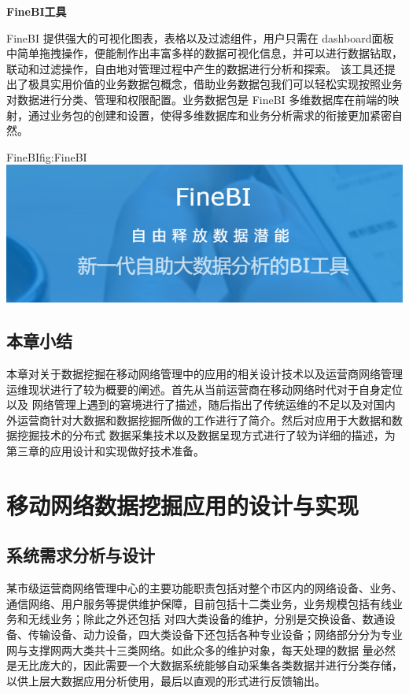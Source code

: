 \documentclass{HustGraduPaper}
\begin{document}
    {\songti \bfseries FineBI工具\\}

    FineBI 提供强大的可视化图表，表格以及过滤组件，用户只需在 dashboard面板中简单拖拽操作，便能制作出丰富多样的数据可视化信息，并可以进行数据钻取，联动和过滤操作，自由地对管理过程中产生的数据进行分析和探索。
    该工具还提出了极具实用价值的业务数据包概念，借助业务数据包我们可以轻松实现按照业务对数据进行分类、管理和权限配置。业务数据包是 FineBI 多维数据库在前端的映射，通过业务包的创建和设置，使得多维数据库和业务分析需求的衔接更加紧密自然。
    \begin{generalfig}[htb]{FineBI}{fig:FineBI} 
        \includegraphics[scale = 0.4]{Figures/FineBI.png}
    \end{generalfig}

    \subsection{本章小结}
    本章对关于数据挖掘在移动网络管理中的应用的相关设计技术以及运营商网络管理运维现状进行了较为概要的阐述。首先从当前运营商在移动网络时代对于自身定位以及
    网络管理上遇到的窘境进行了描述，随后指出了传统运维的不足以及对国内外运营商针对大数据和数据挖掘所做的工作进行了简介。然后对应用于大数据和数据挖掘技术的分布式
    数据采集技术以及数据呈现方式进行了较为详细的描述，为第三章的应用设计和实现做好技术准备。
    \clearpage

    \section{移动网络数据挖掘应用的设计与实现}
    \subsection{系统需求分析与设计}
    某市级运营商网络管理中心的主要功能职责包括对整个市区内的网络设备、业务、通信网络、用户服务等提供维护保障，目前包括十二类业务，业务规模包括有线业务和无线业务；除此之外还包括
    对四大类设备的维护，分别是交换设备、数通设备、传输设备、动力设备，四大类设备下还包括各种专业设备；网络部分分为专业网与支撑网两大类共十三类网络。如此众多的维护对象，每天处理的数据
    量必然是无比庞大的，因此需要一个大数据系统能够自动采集各类数据并进行分类存储，以供上层大数据应用分析使用，最后以直观的形式进行反馈输出。
\end{document}
